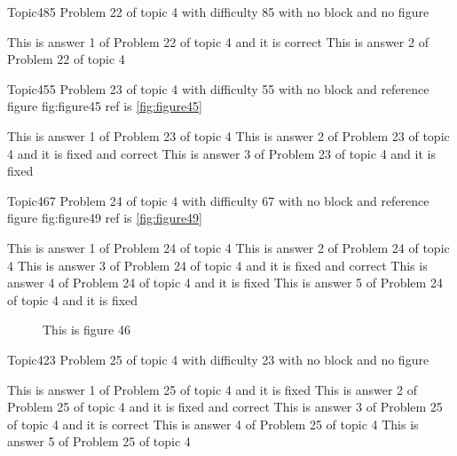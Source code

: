 \documentclass[master]{exam}
\begin{document}
\begin{problem}{Topic4}{85}
	Problem 22 of topic 4 with difficulty 85 with no block and no figure
	\begin{answers}
		\answer[correct] This is answer 1 of Problem 22 of topic 4 and it is correct
		\answer This is answer 2 of Problem 22 of topic 4 
	\end{answers}
\end{problem}

\begin{problem}{Topic4}{55}
	Problem 23 of topic 4 with difficulty 55 with no block and reference figure fig:figure45 ref is \ref{fig:figure45}
	\begin{answers}
		\answer This is answer 1 of Problem 23 of topic 4 
		 This is answer 2 of Problem 23 of topic 4 and it is fixed and correct
		\answer[fixed] This is answer 3 of Problem 23 of topic 4 and it is fixed
	\end{answers}
\end{problem}

\begin{problem}{Topic4}{67}
	Problem 24 of topic 4 with difficulty 67 with no block and reference figure fig:figure49 ref is \ref{fig:figure49}
	\begin{answers}
		\answer This is answer 1 of Problem 24 of topic 4 
		\answer This is answer 2 of Problem 24 of topic 4 
		 This is answer 3 of Problem 24 of topic 4 and it is fixed and correct
		\answer[fixed] This is answer 4 of Problem 24 of topic 4 and it is fixed
		\answer[fixed] This is answer 5 of Problem 24 of topic 4 and it is fixed
	\end{answers}
\end{problem}



\begin{figure}
	\begin{center}
		This is figure 46 
		\label{fig:figure46}
	\end{center}
\end{figure}

\begin{problem}{Topic4}{23}
	Problem 25 of topic 4 with difficulty 23 with no block and no figure
	\begin{answers}
		\answer[fixed] This is answer 1 of Problem 25 of topic 4 and it is fixed
		 This is answer 2 of Problem 25 of topic 4 and it is fixed and correct
		\answer[correct] This is answer 3 of Problem 25 of topic 4 and it is correct
		\answer This is answer 4 of Problem 25 of topic 4 
		\answer This is answer 5 of Problem 25 of topic 4 
	\end{answers}
\end{problem}
\end{document}
